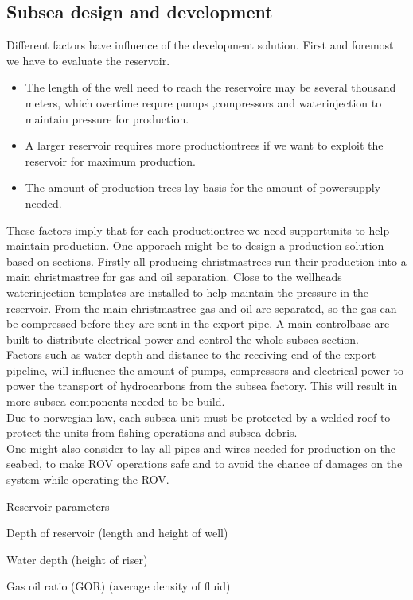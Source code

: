 \documentclass[a4paper,norsk]{article}
\begin{document}
\subsection*{Subsea design and development}
Different factors have influence of the development solution. First and foremost we have to evaluate the reservoir. 
\begin{itemize}
\item The length of the well need to reach the reservoire may be several thousand meters, which overtime requre pumps ,compressors and waterinjection to maintain pressure for production. 
\item A larger reservoir requires more productiontrees if we want to exploit the reservoir for maximum production. 
\item The amount of production trees lay basis for the amount of powersupply needed.
\end{itemize}
These factors imply that for each productiontree we need supportunits to help maintain production. One apporach might be to design a production solution based on sections. Firstly all producing christmastrees run their production into a main christmastree for gas and oil separation. Close to the wellheads waterinjection templates are installed to help maintain the pressure in the reservoir. From the main christmastree gas and oil are separated, so the gas can be compressed before they are sent in the export pipe. A main controlbase are built to distribute electrical power and control the whole subsea section. \\
Factors such as water depth and distance to the receiving end of the export pipeline, will influence the amount of pumps, compressors and electrical power to power the transport of hydrocarbons from the subsea factory. This will result in more subsea components needed to be build. \\
Due to norwegian law, each subsea unit must be protected by a 
welded roof to protect the units from fishing operations and subsea debris. \\ 
One might also consider to lay all pipes and wires needed for production on the seabed, to make ROV operations safe and to avoid the chance of damages on the system while operating the ROV.

Reservoir parameters

Depth of reservoir (length
and height of well)

Water depth (height of riser)

Gas oil ratio (GOR) (average
density of fluid)
\end{document}
